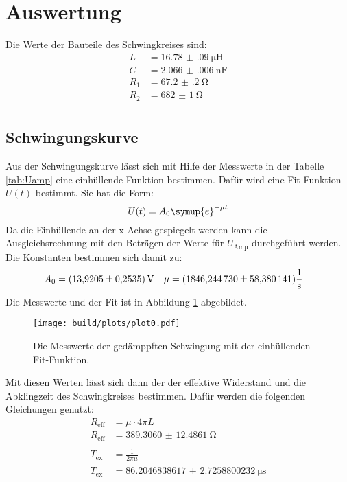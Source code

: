 \newpage
\section{Auswertung}
Die Werte der Bauteile des Schwingkreises sind:
\begin{align*}
    L&=\SI{16.78(09)}{\micro\henry}\\
    C&=\SI{2.066(006)}{\nano\farad}\\
    R_1&=\SI{67.2(2)}{\ohm}\\
    R_2&=\SI{682(1)}{\ohm}\\
\end{align*}

\subsection{Schwingungskurve}
\noindent
Aus der Schwingungskurve lässt sich mit Hilfe der Messwerte in der Tabelle \ref{tab:Uamp} eine einhüllende Funktion bestimmen. 
Dafür wird eine Fit-Funktion $U(t)$ bestimmt. Sie hat die Form:
\begin{equation}
    U(t)=A_0 \symup{e}^{-\mu t} \nonumber
\end{equation}
Da die Einhüllende an der x-Achse gespiegelt werden kann die Ausgleichsrechnung mit den Beträgen der Werte für 
$U_\text{Amp}$ durchgeführt werden. Die Konstanten bestimmen sich damit zu:
\begin{align*}
    A_0&=\SI{13.9205(2535)}{\V} & \mu&=(\num{1846.24473 \pm 58.380141 }) \mathrm{\frac{1}{s}} 
\end{align*}
Die Messwerte und der Fit ist in Abbildung \ref{img:huell} abgebildet.
\begin{figure}[H]
    \centering
    \texttt{[image: build/plots/plot0.pdf]}
    \caption{Die Messwerte der gedämppften Schwingung mit der einhüllenden Fit-Funktion.}
    \label{img:huell}
\end{figure}
\noindent
Mit diesen Werten lässt sich dann der der effektive Widerstand und die Abklingzeit des Schwingkreises bestimmen. 
Dafür werden die folgenden Gleichungen genutzt:
\begin{align*}
    R_\text{eff}&=\mu \cdot 4\pi L\\
    R_\text{eff}&= \SI{389.3060(124861)}{\ohm}  \\\\
    T_\text{ex}&=\frac{1}{2\pi\mu}\\
    T_\text{ex}&=\SI{86.2046838617(27258800232)}{\micro\second}
\end{align*}

